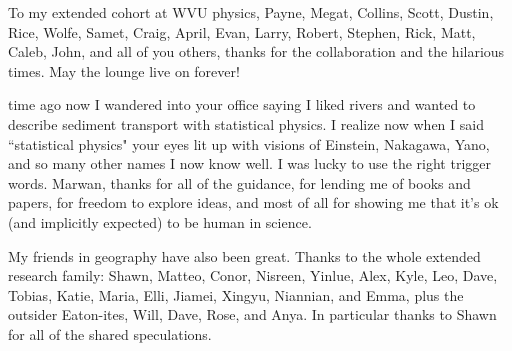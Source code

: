 To my extended cohort at WVU physics, Payne, Megat, Collins, Scott, Dustin, Rice, Wolfe, Samet, Craig, April, Evan, Larry, Robert, Stephen, Rick, Matt, Caleb, John, and all of you others, thanks for the collaboration and the hilarious times. \DIFdelbegin {}\DIFdelend May the lounge live on forever!

\DIFdelbegin {}\DIFdelend \DIFaddbegin {}\DIFaddend time ago now I wandered into your office saying I liked rivers and wanted to describe sediment transport with statistical physics. I realize now when I said ``statistical physics" your eyes lit up with visions of Einstein, Nakagawa, Yano, and so many other names I now know well. I was lucky to use the right trigger words.
Marwan, thanks for \DIFdelbegin {}\DIFdelend all of the guidance, for lending me \DIFdelbegin {}\DIFdelend \DIFaddbegin {}\DIFaddend of books and papers, for \DIFdelbegin {}\DIFdelend \DIFaddbegin {}\DIFaddend freedom to explore ideas, and most of all for showing me that it's ok (and implicitly expected) to be human in science. 

My friends in geography have also been great. Thanks to the whole extended research family: Shawn, Matteo, Conor, Nisreen, Yinlue, Alex, Kyle, Leo, Dave, Tobias, Katie, Maria, Elli, Jiamei, Xingyu, Niannian, and Emma, plus the outsider Eaton-ites, Will, Dave, Rose, and Anya. In particular thanks to Shawn for all of the shared speculations\DIFdelbegin {}\DIFdelend .

